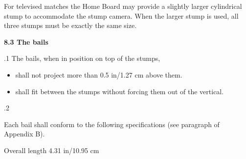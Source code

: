 \documentclass[12pt]{article}
\begin{document}
\vspace{\baselineskip}
\begin{adjustwidth}{0.0in}{0.24in}
{\fontsize{9pt}{10.8pt}\selectfont For televised matches the Home Board may provide a slightly larger cylindrical stump to accommodate the stump camera. When the larger stump is used, all three stumps must be exactly the same size.\par}\par

\end{adjustwidth}


\vspace{\baselineskip}
{\fontsize{11pt}{13.2pt}\selectfont \textbf{8.3 \tabto{0.47in} The bails}\par}\par


\vspace{\baselineskip}
{\fontsize{9pt}{10.8pt}.1 \tabto{0.49in} The bails, when in position on top of the stumps,\par}\par


\vspace{\baselineskip}
\begin{itemize}
	\item {\fontsize{9pt}{10.8pt}\selectfont shall not project more than 0.5 in/1.27 cm above them.\par}\par


\vspace{\baselineskip}
	\item {\fontsize{9pt}{10.8pt}\selectfont shall fit between the stumps without forcing them out of the vertical.\par}
\end{itemize}\par


\vspace{\baselineskip}
{\fontsize{9pt}{10.8pt}.2 \tabto{0.49in} {\fontsize{8pt}{9.6pt}\selectfont Each bail shall conform to the following specifications (see paragraph of Appendix B).\par}\par}\par


\vspace{\baselineskip}
\begin{adjustwidth}{0.5in}{0.0in}
{\fontsize{9pt}{10.8pt}\selectfont Overall length 4.31 in/10.95 cm\par}\par

\end{adjustwidth}
\end{document}
